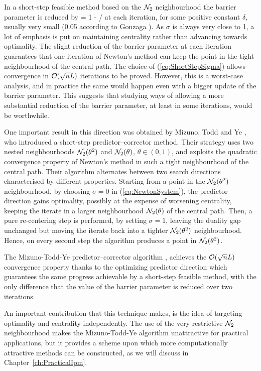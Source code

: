 In a short-step feasible method based on the $\mathcal{N}_2$ neighbourhood
the barrier parameter is reduced by 
\be  \label{eq:ShortStepSigma}
   \sigma = 1 - \delta/
\ee
at each iteration, for some positive constant $\delta$, usually
very small (0.05 according to Gonzaga \cite{Gonzaga91a}).
As $\sigma$ is always very close to 1, a lot of emphasis is put 
on maintaining centrality rather than advancing towards optimality. 
%
The slight reduction of the barrier parameter at
each iteration guarantees that one iteration of Newton's
method can keep the point in the tight neighbourhood of the central path.
The choice of (\ref{eq:ShortStepSigma}) allows convergence
in $\mathcal{O}(\sqrt{n}L)$ iterations to be proved.
However, this is a worst-case analysis, and in practice the same would happen
even with a bigger update of the barrier parameter. This suggests that
studying ways of allowing a more substantial reduction of the barrier
parameter, at least in some iterations, would be worthwhile. 

One important result in this direction was obtained by 
Mizuno, Todd and Ye \cite{MizunoToddYe}, who introduced a short-step 
predictor--corrector method. Their strategy uses two nested neighbourhoods 
$\mathcal{N}_2(\theta^2)$ and $\mathcal{N}_2(\theta)$, $\theta \in (0,1)$, 
and exploits the
quadratic convergence property of Newton's method in such a tight
neighbourhood of the central path.
Their algorithm alternates between two search directions characterised by
different properties.
Starting from a point in the $\mathcal{N}_2(\theta^2)$ neighbourhood,
by choosing $\sigma = 0$ in (\ref{eq:NewtonSystem}),
the predictor direction gains optimality, possibly at the expense of
worsening centrality, keeping the iterate in a larger neighbourhood
$\mathcal{N}_2(\theta)$ of the central path. 
Then, a pure re-centering step is performed, by setting $\sigma = 1$,
leaving the duality gap unchanged but moving the iterate back into a 
tighter $\mathcal{N}_2(\theta^2)$ neighbourhood. Hence, on every second step the 
algorithm produces a point in $\mathcal{N}_2(\theta^2)$.

The Mizuno-Todd-Ye predictor--corrector algorithm \cite{MizunoToddYe},
achieves the $\mathcal{O}(\sqrt{n}L)$ convergence property
thanks to the optimizing predictor
direction which guarantees the same progress achievable by a short-step 
feasible method, with the only 
difference that the value of the barrier parameter is reduced over
two iterations.

An important contribution that this technique makes, is the idea 
of targeting optimality and centrality independently. 
The use of the very restrictive $\mathcal{N}_2$ neighbourhood 
makes the Mizuno-Todd-Ye algorithm unattractive for practical applications,
but it provides a scheme 
upon which more computationally attractive methods can be constructed,
as we will discuss in Chapter~\ref{ch:PracticalIpm}.

